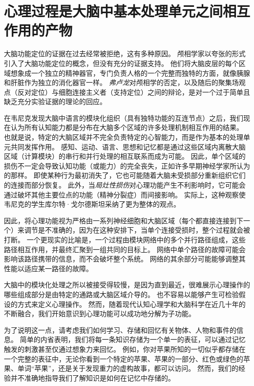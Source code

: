 \section{心理过程是大脑中基本处理单元之间相互作用的产物}

大脑功能定位的证据在过去经常被拒绝，这有多种原因。
颅相学家以夸张的形式引入了大脑功能定位的概念，但没有充分的证据支持。
他们将大脑皮层的每个区域想象成一个独立的精神器官，专门负责人格的一个完整而独特的方面，就像胰腺和肝脏作为独立的消化器官一样。
\textit{弗卢龙}对颅相学的否定，以及随后的聚集场观点（反对定位）与细胞连接主义者（支持定位）之间的辩论，是对一个过于简单且缺乏充分实验证据的理论的回应。


在韦尼克发现大脑中语言的模块化组织（具有独特功能的互连节点）之后，我们现在认为所有认知能力都是分布在大脑多个区域的许多处理机制相互作用的结果。
也就是说，特定的大脑区域并不完全负责特定的心智能力，而是作为基本的处理单元共同发挥作用。
感知、运动、语言、思想和记忆都是通过这些区域内离散大脑区域（计算模块）的串行和并行处理的相互联系而成为可能。
因此，单个区域的损伤不一定会导致认知功能（或能力）的完全丧失，正如许多早期神经学家所认为的那样。
即使某种行为最初消失了，它也可能随着大脑未受损部分重新组织它们的连接而部分恢复。
此外，当\textit{局灶性损伤}对心理功能产生不利影响时，它可能会通过破坏其他主要位点的功能（精神分裂症）而间接影响。
实际上，这种观察使韦尼克的学生库尔特·戈尔德斯坦采纳了更为整体的观点。



因此，将心理功能视为严格由一系列神经细胞和大脑区域（每个都直接连接到下一个）来调节是不准确的，因为在这种安排下，当单个连接受损时，整个过程就会被打断。
一个更现实的比喻是，一个过程由模块网络中的多个并行路径组成，这些路径相互作用，并最终汇聚到一组共同的目标上。
网络中单个路径的故障可能会影响该路径携带的信息，而不会破坏整个系统。
网络的其余部分可能能够调整其性能以适应某一路径的故障。






大脑中的模块化处理之所以被接受得较慢，是因为直到最近，很难展示心理操作的哪些组成部分是由特定的通路或大脑区域介导的。
也不容易以能够产生可检验假设的方式来定义心理操作。
然而，随着现代认知心理学和大脑科学在近几十年的不断融合，我们开始意识到心理功能可以成功地分解为子功能。


为了说明这一点，请考虑我们如何学习、存储和回忆有关物体、人物和事件的信息。
简单的内省表明，我们将每一条知识存储为一个单一的表征，可以通过记忆触发的刺激甚至仅通过想象力来回忆。
例如，你对苹果所知的一切似乎都存储在一个完整的表征中，无论你看到一个特定的苹果、苹果的一部分、红色或绿色的苹果、单词“苹果”，还是关于发现重力的虚构故事，都可以访问。
然而，我们的经验并不准确地指导我们了解知识是如何在记忆中存储的。






